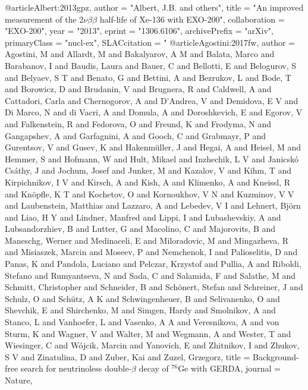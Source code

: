 {{%
@article{Albert:2013gpz,
      author         = "Albert, J.B. and others",
      title          = "{An improved measurement of the $2\nu \beta \beta$
                        half-life of Xe-136 with EXO-200}",
      collaboration  = "EXO-200",
      year           = "2013",
      eprint         = "1306.6106",
      archivePrefix  = "arXiv",
      primaryClass   = "nucl-ex",
      SLACcitation   = "%
}
@article{Agostini:2017fw,
author = {Agostini, M and Allardt, M and Bakalyarov, A M and Balata, Marco and Barabanov, I and Baudis, Laura and Bauer, C and Bellotti, E and Belogurov, S and Belyaev, S T and Benato, G and Bettini, A and Bezrukov, L and Bode, T and Borowicz, D and Brudanin, V and Brugnera, R and Caldwell, A and Cattadori, Carla and Chernogorov, A and D{\textquoteright}Andrea, V and Demidova, E V and Di Marco, N and di Vacri, A and Domula, A and Doroshkevich, E and Egorov, V and Falkenstein, R and Fedorova, O and Freund, K and Frodyma, N and Gangapshev, A and Garfagnini, A and Gooch, C and Grabmayr, P and Gurentsov, V and Gusev, K and Hakenm{\"u}ller, J and Hegai, A and Heisel, M and Hemmer, S and Hofmann, W and Hult, Mikael and Inzhechik, L V and Janicsk{\'o} Cs{\'a}thy, J and Jochum, Josef and Junker, M and Kazalov, V and Kihm, T and Kirpichnikov, I V and Kirsch, A and Kish, A and Klimenko, A and Kneissl, R and Kn{\"o}pfle, K T and Kochetov, O and Kornoukhov, V N and Kuzminov, V V and Laubenstein, Matthias and Lazzaro, A and Lebedev, V I and Lehnert, Bj{\"o}rn and Liao, H Y and Lindner, Manfred and Lippi, I and Lubashevskiy, A and Lubsandorzhiev, B and Lutter, G and Macolino, C and Majorovits, B and Maneschg, Werner and Medinaceli, E and Miloradovic, M and Mingazheva, R and Misiaszek, Marcin and Moseev, P and Nemchenok, I and Palioselitis, D and Panas, K and Pandola, Luciano and Pelczar, Krzystof and Pullia, A and Riboldi, Stefano and Rumyantseva, N and Sada, C and Salamida, F and Salathe, M and Schmitt, Christopher and Schneider, B and Sch{\"o}nert, Stefan and Schreiner, J and Schulz, O and Sch{\"u}tz, A K and Schwingenheuer, B and Selivanenko, O and Shevchik, E and Shirchenko, M and Simgen, Hardy and Smolnikov, A and Stanco, L and Vanhoefer, L and Vasenko, A A and Veresnikova, A and von Sturm, K and Wagner, V and Walter, M and Wegmann, A and Wester, T and Wiesinger, C and W{\'o}jcik, Marcin and Yanovich, E and Zhitnikov, I and Zhukov, S V and Zinatulina, D and Zuber, Kai and Zuzel, Grzegorz},
title = {{Background-free search for neutrinoless double-$\beta$ decay of $^{76}$Ge with GERDA}},
journal = {Nature},
}}}
